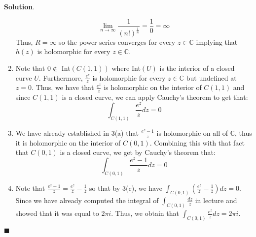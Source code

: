 \documentclass[12pt]{article}
\renewcommand{\=}[1]{\stackrel{#1}{=}} %
\theoremstyle{definition}
\theoremstyle{definition}
\newenvironment{s}{%
        \begin{trivlist} \item \textbf{Solution}. }{%
            \hspace*{\fill} $\blacksquare$\end{trivlist}}%
\begin{document}
\begin{s}
\begin{enumerate}
    \[ \lim_{n\to\infty} \frac{1}{(n!)^{\frac{1}{n}}} = \frac{1}{0} = \infty \]
    Thus, $R = \infty$ so the power series converges for every $z\in\mathbb{C}$ implying that $h(z)$ is holomorphic for every $z\in\mathbb{C}$.
        \item Note that $0\not\in$ Int$(C(1,1))$ where Int$(U)$ is the interior of a closed curve $U$. Furthermore, $\frac{e^z}{z}$ is
            holomorphic for every $z\in\mathbb{C}$ but undefined at $z=0$. Thus, we have that $\frac{e^z}{z}$ is holomorphic on the interior
            of $C(1,1)$ and since $C(1,1)$ is a closed curve, we can apply Cauchy's theorem to get that:
            \[ \int_{C(1,1)} \frac{e^z}{z}dz = 0 \]
        \item We have already established in 3(a) that $\frac{e^z-1}{z}$ is holomorphic on all of $\mathbb{C}$, thus it is holomorphic
            on the interior of $C(0,1)$. Combining this with that fact that $C(0,1)$ is a closed curve, we get by Cauchy's theorem that:
            \[ \int_{C(0,1)} \frac{e^z-1}{z}dz = 0 \]
        \item Note that $\frac{e^z-1}{z} = \frac{e^z}{z} - \frac{1}{z}$ so that by 3(c), we have $\int_{C(0,1)} (\frac{e^z}{z} - \frac{1}{z})dz = 0$.
            Since we have already computed the integral of $\int_{C(0,1)} \frac{dz}{z}$ in lecture and showed that it was equal to $2\pi i$. Thus, we
            obtain that $\int_{C(0,1)} \frac{e^z}{z}dz = 2\pi i$.
    \end{enumerate}
\end{s}
\end{document}
